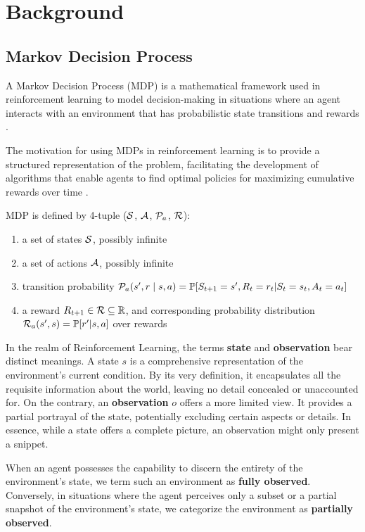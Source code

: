 \section{Background}
\subsection{Markov Decision Process}
A Markov Decision Process (MDP) is a mathematical framework used in reinforcement learning to model decision-making in situations where an agent interacts with an environment that has probabilistic state transitions and rewards \cite{Markov}. 

The motivation for using MDPs in reinforcement learning is to provide a structured representation of the problem, facilitating the development of algorithms that enable agents to find optimal policies for maximizing cumulative rewards over time \cite{RL2}.
\begin{definition}
    MDP is defined by 4-tuple ($\mathcal{S}$, $\mathcal A$, $\mathcal P_a$, $\mathcal R$):
    \begin{enumerate}
        \item a set of states $\mathcal{S}$, possibly infinite
        \item a set of actions $\mathcal A$, possibly infinite
        \item  transition probability $\mathcal P_a(s', r \mid s, a) = \mathbb P [S_{t+1} = s', R_t = r_t| S_{t} =s_t ,A_{t} = a_t]$
        \item a reward $R_{t+1} \in \mathcal R \subseteq \mathbb R$, and corresponding probability distribution $ \mathcal R_a(s',s) = \mathbb P[r' | s,a]$ over rewards
    \end{enumerate}
\end{definition}
 In the realm of Reinforcement Learning, the terms \textbf{state} and \textbf{observation} bear distinct meanings. A state $s$ is a comprehensive representation of the environment's current condition. By its very definition, it encapsulates all the requisite information about the world, leaving no detail concealed or unaccounted for. On the contrary, an \textbf{observation} $o$ offers a more limited view. It provides a partial portrayal of the state, potentially excluding certain aspects or details. In essence, while a state offers a complete picture, an observation might only present a snippet.
 
When an agent possesses the capability to discern the entirety of the environment's state, we term such an environment as \textbf{fully observed}. Conversely, in situations where the agent perceives only a subset or a partial snapshot of the environment's state, we categorize the environment as \textbf{partially observed}.


